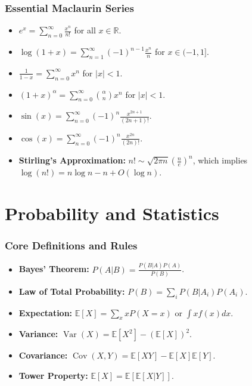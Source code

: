 \documentclass[11pt]{article}
\DeclareMathOperator{\Var}{Var}
\DeclareMathOperator{\Cov}{Cov}
\begin{document}
\section{Essential Maclaurin Series}
\begin{itemize}
    \item \( e^x = \sum_{n=0}^{\infty} \frac{x^n}{n!} \) for all \(x \in \mathbb{R}\).
    \item \( \log(1+x) = \sum_{n=1}^{\infty} (-1)^{n-1} \frac{x^n}{n} \) for \(x \in (-1, 1]\).
    \item \( \frac{1}{1-x} = \sum_{n=0}^{\infty} x^n \) for \(|x| < 1\).
    \item \( (1+x)^\alpha = \sum_{n=0}^{\infty} \binom{\alpha}{n} x^n \) for \(|x| < 1\).
    \item \( \sin(x) = \sum_{n=0}^{\infty} (-1)^n \frac{x^{2n+1}}{(2n+1)!} \).
    \item \( \cos(x) = \sum_{n=0}^{\infty} (-1)^n \frac{x^{2n}}{(2n)!} \).
    \item \textbf{Stirling's Approximation:} \( n! \sim \sqrt{2\pi n} \left(\frac{n}{e}\right)^n \), which implies \(\log(n!) = n \log n - n + O(\log n)\).
\end{itemize}

\hrulefill

\part{Probability and Statistics}

\section{Core Definitions and Rules}
\begin{itemize}
    \item \textbf{Bayes' Theorem:} \( P(A|B) = \frac{P(B|A)P(A)}{P(B)} \).
    \item \textbf{Law of Total Probability:} \( P(B) = \sum_i P(B|A_i)P(A_i) \).
    \item \textbf{Expectation:} \( \mathbb{E}[X] = \sum_x x P(X=x) \) or \( \int x f(x) dx \).
    \item \textbf{Variance:} \( \Var(X) = \mathbb{E}[X^2] - (\mathbb{E}[X])^2 \).
    \item \textbf{Covariance:} \( \Cov(X,Y) = \mathbb{E}[XY] - \mathbb{E}[X]\mathbb{E}[Y] \).
    \item \textbf{Tower Property:} \( \mathbb{E}[X] = \mathbb{E}[\mathbb{E}[X|Y]] \).
\end{itemize}
\end{document}
